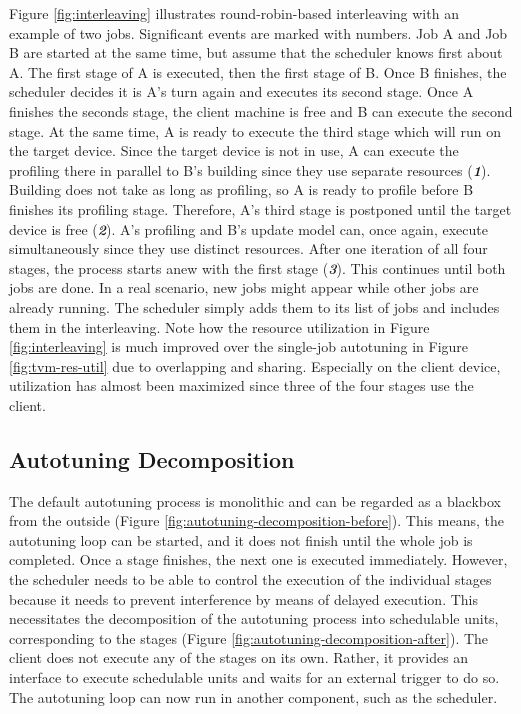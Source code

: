 Figure \ref{fig:interleaving} illustrates round-robin-based interleaving with an example of two jobs. Significant events are marked with numbers. Job A and Job B are started at the same time, but assume that the scheduler knows first about A. The first stage of A is executed, then the first stage of B. Once B finishes, the scheduler decides it is A's turn again and executes its second stage. Once A finishes the seconds stage, the client machine is free and B can execute the second stage. At the same time, A is ready to execute the third stage which will run on the target device. Since the target device is not in use, A can execute the profiling there in parallel to B's building since they use separate resources (\textbf{\textit{1}}). Building does not take as long as profiling, so A is ready to profile before B finishes its profiling stage. Therefore, A's third stage is postponed until the target device is free (\textbf{\textit{2}}). A's profiling and B's update model can, once again, execute simultaneously since they use distinct resources. After one iteration of all four stages, the process starts anew with the first stage (\textbf{\textit{3}}). This continues until both jobs are done. In a real scenario, new jobs might appear while other jobs are already running. The scheduler simply adds them to its list of jobs and includes them in the interleaving. Note how the resource utilization in Figure \ref{fig:interleaving} is much improved over the single-job autotuning in Figure \ref{fig:tvm-res-util} due to overlapping and sharing. Especially on the client device, utilization has almost been maximized since three of the four stages use the client.

\subsection{Autotuning Decomposition}
The default autotuning process is monolithic and can be regarded as a blackbox from the outside (Figure \ref{fig:autotuning-decomposition-before}). This means, the autotuning loop can be started, and it does not finish until the whole job is completed. Once a stage finishes, the next one is executed immediately. However, the scheduler needs to be able to control the execution of the individual stages because it needs to prevent interference by means of delayed execution. This necessitates the decomposition of the autotuning process into schedulable units, corresponding to the stages  (Figure \ref{fig:autotuning-decomposition-after}). The client does not execute any of the stages on its own. Rather, it provides an interface to execute schedulable units and waits for an external trigger to do so. The autotuning loop can now run in another component, such as the scheduler.

